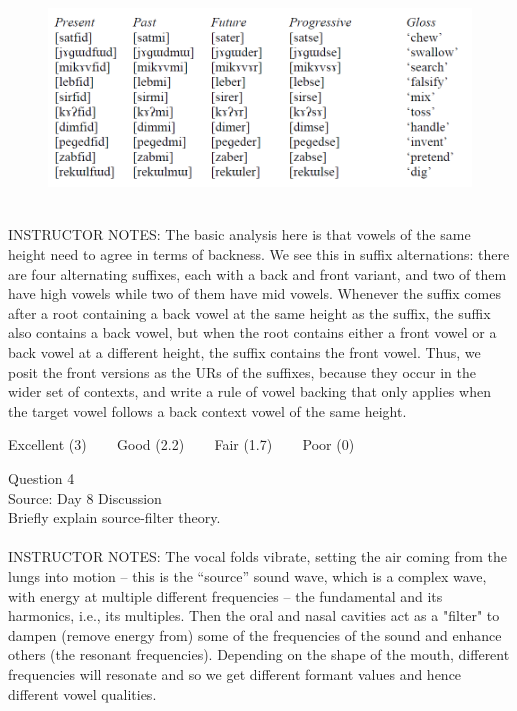 \documentclass[12pt]{article}
\begin{document}
\begin{figure}[H]
\includegraphics{../images/final_dataset.png}
\end{figure}

~\\
INSTRUCTOR NOTES: The basic analysis here is that vowels of the same height need to agree in terms of backness. We see this in suffix alternations: there are four alternating suffixes, each with a back and front variant, and two of them have high vowels while two of them have mid vowels. Whenever the suffix comes after a root containing a back vowel at the same height as the suffix, the suffix also contains a back vowel, but when the root contains either a front vowel or a back vowel at a different height, the suffix contains the front vowel. Thus, we posit the front versions as the URs of the suffixes, because they occur in the wider set of contexts, and write a rule of vowel backing that only applies when the target vowel follows a back context vowel of the same height.


\vfill
Excellent (3) ~~~ Good (2.2) ~~~ Fair (1.7) ~~~ Poor (0)
\newpage

{\large Question 4}\\

Source: Day 8 Discussion\\

Briefly explain source-filter theory.\\


~\\
INSTRUCTOR NOTES: The vocal folds vibrate, setting the air coming from the lungs into motion -- this is the ``source'' sound wave, which is a complex wave, with energy at multiple different frequencies – the fundamental and its harmonics, i.e., its multiples. Then the oral and nasal cavities act as a "filter" to dampen (remove energy from) some of the frequencies of the sound and enhance others (the resonant frequencies). Depending on the shape of the mouth, different frequencies will resonate and so we get different formant values and hence different vowel qualities.
\end{document}
